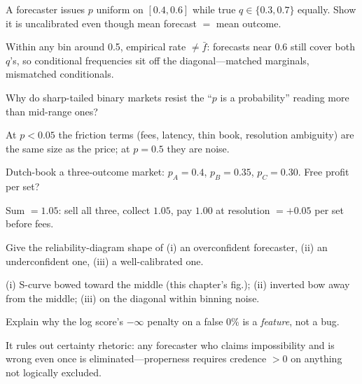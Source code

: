 \begin{exercise}
A forecaster issues $p$ uniform on $[0.4,0.6]$ while true $q\in\{0.3,0.7\}$ equally. Show it is
uncalibrated even though mean forecast $=$ mean outcome.
\end{exercise}
\begin{solution}
Within any bin around 0.5, empirical rate $\neq\bar f$: forecasts near 0.6 still cover both
$q$'s, so conditional frequencies sit off the diagonal---matched marginals, mismatched
conditionals.
\end{solution}

\begin{exercise}
Why do sharp-tailed binary markets resist the ``$p$ is a probability'' reading more than
mid-range ones?
\end{exercise}
\begin{solution}
At $p<0.05$ the friction terms (fees, latency, thin book, resolution ambiguity) are the same
size as the price; at $p=0.5$ they are noise.
\end{solution}

\begin{exercise}
Dutch-book a three-outcome market: $p_A{=}0.4$, $p_B{=}0.35$, $p_C{=}0.30$. Free profit per
set?
\end{exercise}
\begin{solution}
Sum $=1.05$: sell all three, collect $1.05$, pay $1.00$ at resolution $=+0.05$ per set
before fees.
\end{solution}

\begin{exercise}
Give the reliability-diagram shape of (i) an overconfident forecaster, (ii) an underconfident
one, (iii) a well-calibrated one.
\end{exercise}
\begin{solution}
(i) S-curve bowed toward the middle (this chapter's fig.); (ii) inverted bow away from the
middle; (iii) on the diagonal within binning noise.
\end{solution}

\begin{exercise}
Explain why the log score's $-\infty$ penalty on a false 0\% is a \emph{feature}, not a bug.
\end{exercise}
\begin{solution}
It rules out certainty rhetoric: any forecaster who claims impossibility and is wrong even
once is eliminated---properness requires credence $>0$ on anything not logically excluded.
\end{solution}

